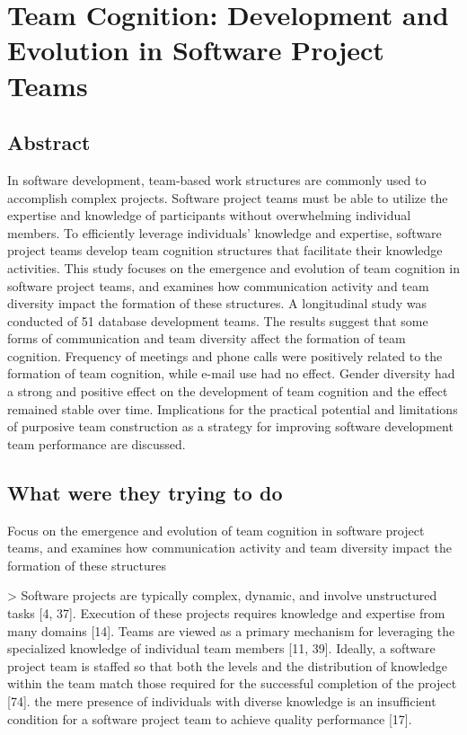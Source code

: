 
\section{Team Cognition: Development and Evolution in Software Project Teams}

\subsection{Abstract}

In software development, team-based work structures are commonly used to accomplish complex projects. Software project teams must be able to utilize the expertise and knowledge of participants without overwhelming individual members. To efficiently leverage individuals' knowledge and expertise, software project teams develop team cognition structures that facilitate their knowledge activities. This study focuses on the emergence and evolution of team cognition in software project teams, and examines how communication activity and team diversity impact the formation of these structures. A longitudinal study was conducted of 51 database development teams. The results suggest that some forms of communication and team diversity affect the formation of team cognition. Frequency of meetings and phone calls were positively related to the formation of team cognition, while e-mail use had no effect. Gender diversity had a strong and positive effect on the development of team cognition and the effect remained stable over time. Implications for the practical potential and limitations of purposive team construction as a strategy for improving software development team performance are discussed.

\subsection{What were they trying to do}

Focus on the emergence and evolution of team cognition in software project teams, and examines how communication activity and team diversity impact the formation of these structures

> Software projects are typically complex, dynamic, and involve unstructured tasks [4, 37]. Execution of these projects requires knowledge and expertise from many domains [14]. Teams are viewed as a primary mechanism for leveraging the specialized knowledge of individual team members [11, 39]. Ideally, a software project team is staffed so that both the levels and the distribution of knowledge within the team match those required for the successful completion of the project [74]. the mere presence of individuals with diverse knowledge is an insufficient condition for a software project team to achieve quality performance [17].

